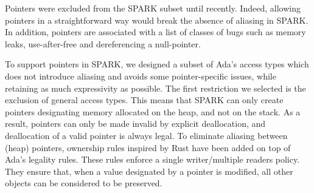 \documentclass[runningheads]{llncs}
\begin{document}
Pointers were excluded from the SPARK subset until recently. Indeed, allowing pointers in a straightforward way would break the absence of aliasing in SPARK. In addition, pointers are associated with a list of classes of bugs such as memory leaks, use-after-free and dereferencing a null-pointer.%

To support pointers in SPARK, we designed a subset of Ada's access types which does not introduce aliasing and avoids some pointer-specific issues, while retaining as much expressivity as possible. The first restriction we selected is the exclusion of general access types. This means that SPARK can only create pointers designating memory allocated on the heap, and not on the stack. As a result, pointers can only be made invalid by explicit deallocation, and deallocation of a valid pointer is always legal. %
To eliminate aliasing between (heap) pointers, ownership rules inspired by Rust have been added on top of Ada's legality rules. These rules enforce a single writer/multiple readers policy. They ensure that, when a value designated by a pointer is modified, all other objects can be considered to be preserved.
\end{document}
